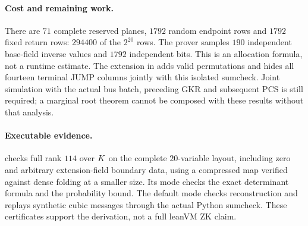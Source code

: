 \documentclass[11pt]{article}
\begin{document}
\paragraph{Cost and remaining work.} There are $71$ complete reserved planes, $1792$ random endpoint rows and $1792$ fixed return rows: $294400$ of the $2^{20}$ rows. The prover samples $190$ independent base-field inverse values and $1792$ independent bits. This is an allocation formula, not a runtime estimate. The extension in  adds valid permutations and hides all fourteen terminal JUMP columns jointly with this isolated sumcheck. Joint simulation with the actual bus batch, preceding GKR and subsequent PCS is still required; a marginal root theorem cannot be composed with these results without that analysis.

\paragraph{Executable evidence.}  checks full rank $114$ over $K$ on the complete $20$-variable layout, including zero and arbitrary extension-field boundary data, using a compressed map verified against dense folding at a smaller size. Its  mode checks the exact determinant formula and the probability bound. The default mode checks reconstruction and replays synthetic cubic messages through the actual Python sumcheck. These certificates support the derivation, not a full leanVM ZK claim.
\end{document}
